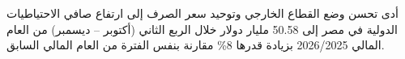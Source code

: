 أدى تحسن وضع القطاع الخارجي وتوحيد سعر الصرف إلى ارتفاع صافي الاحتياطيات الدولية في مصر إلى 50.58 مليار دولار خلال الربع الثاني (أكتوبر -- ديسمبر) من العام المالي 2026/2025 بزيادة قدرها 8\% مقارنة بنفس الفترة من العام المالي السابق.
